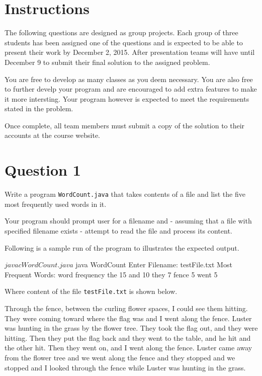 \section*{Instructions}

The following questions are designed as group projects.
Each group of three students has been assigned one of the questions and is expected to be able to present their work by December 2, 2015.
After presentation teams will have until December 9 to submit their final solution to the assigned problem.

You are free to develop as many classes as you deem necessary.
You are also free to further develp your program and are encouraged to add extra features to make it more intersting.
Your program however is expected to meet the requirements stated in the problem.

Once complete, all team members must submit a copy of the solution to their accounts at the course website.

\section*{Question 1}

Write a program \texttt{WordCount.java} that takes contents of a file and list the five most frequently used words in it.

Your program should prompt user for a filename and - assuming that a file with specified filename exists - attempt to read the file and process its content.

Following is a sample run of the program to illustrates the expected output.

\begin{terminal}
$ javac WordCount.java
$ java WordCount
Enter Filename: testFile.txt
Most Frequent Words:
word            frequency
the             15
and             10
they            7
fence           5
went            5
\end{terminal}

Where content of the file \texttt{testFile.txt} is shown below.

\begin{displayquote}
Through the fence, between the curling flower spaces, I could see them hitting.
They were coming toward where the flag was and I went along the fence.
Luster was hunting in the grass by the flower tree.
They took the flag out, and they were hitting.
Then they put the flag back and they went to the table, and he hit and the other hit.
Then they went on, and I went along the fence.
Luster came away from the flower tree and we went along the fence and they stopped and we stopped and I looked through the fence while Luster was hunting in the grass.
\end{displayquote}

